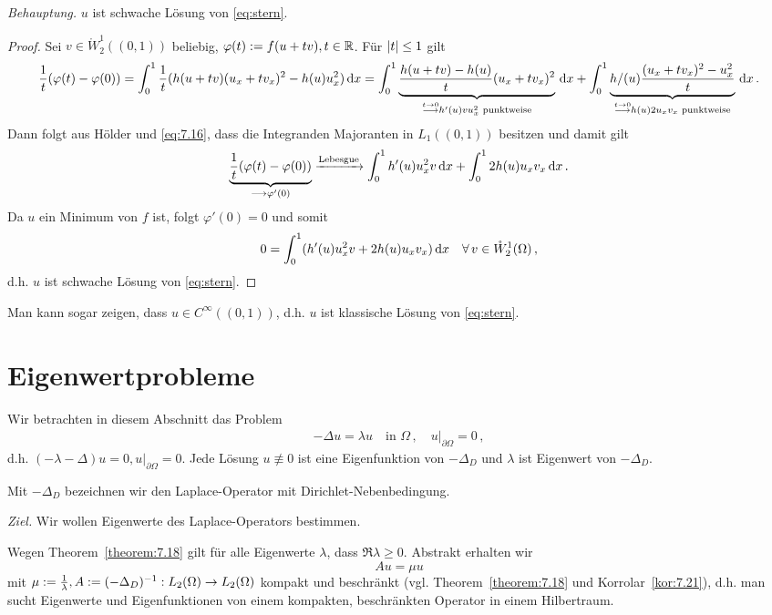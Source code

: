 \begin{bsp}
\begin{enumerate}[(a)]
\textit{Behauptung.} $u$ ist schwache Lösung von \eqref{eq:stern}.
\begin{proof}
Sei $v \in \mathring W^1_2((0,1))$ beliebig, $\varphi(t) := f(u+tv), t \in \mathbb{R}$. Für $\lvert t\rvert \leq 1$ gilt
\begin{dmath*}
	\frac 1 t (\varphi(t) - \varphi(0)) = \int_0^1 \frac 1 t (h(u+tv) (u_x + tv_x)^2 - h(u) u_x^2) \d x
	= \int_0^1 \underbrace{\frac{h(u+tv)-h(u)}t (u_x+tv_x)^2}_{\stackrel{t\ra 0}\longrightarrow h'(u) vu_x^2 \text{ punktweise}} \d x + \int_0^1 \underbrace{h/(u) \frac{(u_x+tv_x)^2-u_x^2}t}_{\stackrel{t\ra 0}\longrightarrow h(u) 2 u_xv_x \text{ punktweise}} \d x \, .
\end{dmath*}
Dann folgt aus Hölder und \eqref{eq:7.16}, dass die Integranden Majoranten in $L_1((0,1))$ besitzen und damit gilt
\[
	\underbrace{\frac 1 t (\varphi(t) - \varphi(0))}_{\longrightarrow \varphi'(0)} \xrightarrow{\scriptsize\text{Lebesgue}} \int_0^1 h'(u) u_x^2 v \,\mathrm{d} x + \int_0^1 2h(u) u_xv_x \,\mathrm{d} x \, .
\]
Da $u$ ein Minimum von $f$ ist, folgt $\varphi'(0) = 0$ und somit
\[
	 0 =  \int_0^1 ( h'(u) u_x^2 v  +  2h(u) u_xv_x) \,\mathrm{d} x \quad \forall \, v \in \mathring W^1_2(\Omega) \,  ,
\]
d.h. $u$ ist schwache Lösung von \eqref{eq:stern}.
\end{proof}
Man kann sogar zeigen, dass $u \in C^\infty ((0,1))$, d.h. $u$ ist klassische Lösung von \eqref{eq:stern}.
\end{enumerate}
\end{bsp}

\section{Eigenwertprobleme}

Wir betrachten in diesem Abschnitt das Problem
\begin{align*}
	-\Delta u = \lambda u\quad \text{in } \Omega \, , \quad u|_{\partial\Omega} = 0 \, , 
\end{align*}
d.h. $(-\lambda - \Delta)u = 0, u|_{\partial\Omega} = 0$. Jede Lösung $u \not\equiv 0$ ist eine Eigenfunktion von $-\Delta_D$ und $\lambda$ ist Eigenwert von $-\Delta_D$.

\begin{notation}
Mit $-\Delta_D$ bezeichnen wir den Laplace-Operator mit Dirichlet-Nebenbedingung.
\end{notation}

\textit{Ziel.} Wir wollen Eigenwerte des Laplace-Operators bestimmen.

Wegen Theorem~\ref{theorem:7.18} gilt für alle Eigenwerte $\lambda$, dass $\Re \lambda \geq 0$. Abstrakt erhalten wir
\[
	Au = \mu u
\]
mit $\mu := \frac 1 \lambda, A :=(-\Delta_D)^{-1} : L_2(\Omega)\rightarrow L_2(\Omega)$ kompakt und beschränkt (vgl. Theorem~\ref{theorem:7.18} und Korrolar~\ref{kor:7.21}), d.h. man sucht Eigenwerte und Eigenfunktionen von einem kompakten, beschränkten Operator in einem Hilbertraum.

